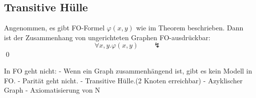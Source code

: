 \subsection{Transitive Hülle}

Angenommen, es gibt FO-Formel $\varphi(x,y)$ wie im Theorem beschrieben.
Dann ist der Zusammenhang von ungerichteten Graphen FO-ausdrückbar:
\[
  \forall x,y.\varphi(x,y)\qquad\lightning
\]
\qed

In FO geht nicht:
- Wenn ein Graph zusammenhängend ist, gibt es kein Modell in FO.
- Parität geht nicht.
- Transitive Hülle.(2 Knoten erreichbar)
- Azyklischer Graph
- Axiomatisierung von N
